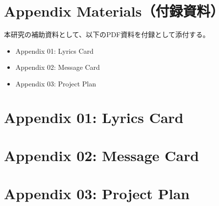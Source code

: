 \appendix

\section{Appendix Materials（付録資料）}

本研究の補助資料として、以下のPDF資料を付録として添付する。

\begin{itemize}
\item Appendix 01: Lyrics Card
\item Appendix 02: Message Card
\item Appendix 03: Project Plan
\end{itemize}

\clearpage

\section{Appendix 01: Lyrics Card}



\clearpage

\section{Appendix 02: Message Card}



\clearpage

\section{Appendix 03: Project Plan}


